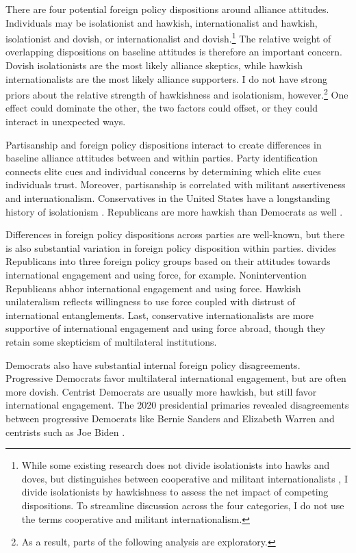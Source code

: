 \documentclass[12pt]{article}
\begin{document}
There are four potential foreign policy dispositions around alliance attitudes.
Individuals may be isolationist and hawkish, internationalist and hawkish, isolationist and dovish, or internationalist and dovish.\footnote{While some existing research does not divide isolationists into hawks and doves, but distinguishes between cooperative and militant internationalists \citep{Kertzeretal2014}, I divide isolationists by hawkishness to assess the net impact of competing dispositions. To streamline discussion across the four categories, I do not use the terms cooperative and militant internationalism.}
The relative weight of overlapping dispositions on baseline attitudes is therefore an important concern. 
Dovish isolationists are the most likely alliance skeptics, while hawkish internationalists are the most likely alliance supporters. 
I do not have strong priors about the relative strength of hawkishness and isolationism, however.\footnote{As a result, parts of the following analysis are exploratory.}
One effect could dominate the other, the two factors could offset, or they could interact in unexpected ways.


Partisanship and foreign policy dispositions interact to create differences in baseline alliance attitudes between and within parties. 
Party identification connects elite cues and individual concerns by determining which elite cues individuals trust.
Moreover, partisanship is correlated with militant assertiveness and internationalism. 
Conservatives in the United States have a longstanding history of isolationism \citep{Kupchan2020}.
Republicans are more hawkish than Democrats as well \citep{Gries2014}. 


Differences in foreign policy dispositions across parties are well-known, but there is also substantial variation in foreign policy disposition within parties.
\citet{Dueck2019} divides Republicans into three foreign policy groups based on their attitudes towards international engagement and using force, for example.
Nonintervention Republicans abhor international engagement and using force.
Hawkish unilateralism reflects willingness to use force coupled with distrust of international entanglements. 
Last, conservative internationalists are more supportive of international engagement and using force abroad, though they retain some skepticism of multilateral institutions.


Democrats also have substantial internal foreign policy disagreements. 
Progressive Democrats favor multilateral international engagement, but are often more dovish.
Centrist Democrats are usually more hawkish, but still favor international engagement. 
The 2020 presidential primaries revealed disagreements between progressive Democrats like Bernie Sanders and Elizabeth Warren and centrists such as Joe Biden \citep{Robinson2019demfp}. 
\end{document}
